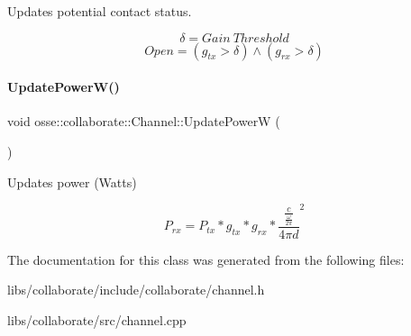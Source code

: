 Updates potential contact status. 

\[ \delta = Gain~Threshold \] \[ Open = (g_{tx} > \delta) \land (g_{rx} > \delta) \] \mbox{\label{classosse_1_1collaborate_1_1_channel_a1b086fb253ad06cdbaff229b9916ee7b}} 
\paragraph{\texorpdfstring{Update\+Power\+W()}{UpdatePowerW()}}
{\footnotesize\ttfamily void osse\+::collaborate\+::\+Channel\+::\+Update\+PowerW (\begin{DoxyParamCaption}{ }\end{DoxyParamCaption})\hspace{0.3cm}{\ttfamily [private]}}



Updates power (Watts) 

\[ P_{rx} = P_{tx} * g_{tx} * g_{rx} * \frac{\frac{c}{\frac{\omega}{2\pi}}}{4\pi d}^2 \] 

The documentation for this class was generated from the following files\+:\begin{DoxyCompactItemize}
\item 
libs/collaborate/include/collaborate/channel.\+h\item 
libs/collaborate/src/channel.\+cpp\end{DoxyCompactItemize}
